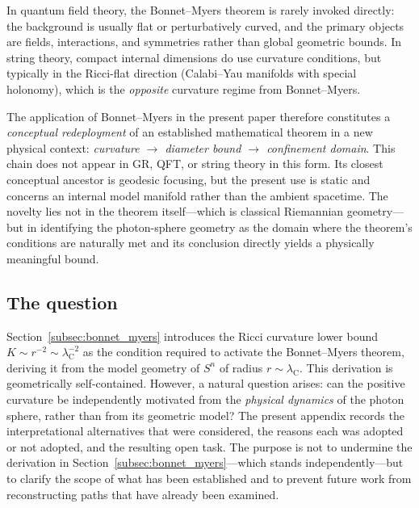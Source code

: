 \documentclass[%
 reprint, amsmath,amssymb, aps, prb, ]{revtex4-2}
\numberwithin{equation}{section}
\newcommand{\lambdaC}{\lambda_{\mathrm{C}}}
\begin{document}
In quantum field theory, the Bonnet--Myers theorem is rarely invoked directly: the background is usually flat or perturbatively curved, and the primary objects are fields, interactions, and symmetries rather than global geometric bounds. In string theory, compact internal dimensions do use curvature conditions, but typically in the Ricci-flat direction (Calabi--Yau manifolds with special holonomy), which is the \emph{opposite} curvature regime from Bonnet--Myers.

The application of Bonnet--Myers in the present paper therefore constitutes a \emph{conceptual redeployment} of an established mathematical theorem in a new physical context: \emph{curvature $\to$ diameter bound $\to$ confinement domain}. This chain does not appear in GR, QFT, or string theory in this form. Its closest conceptual ancestor is geodesic focusing, but the present use is static and concerns an internal model manifold rather than the ambient spacetime. The novelty lies not in the theorem itself---which is classical Riemannian geometry---but in identifying the photon-sphere geometry as the domain where the theorem's conditions are naturally met and its conclusion directly yields a physically meaningful bound.

\subsection{The question}

Section~\ref{subsec:bonnet_myers} introduces the Ricci curvature lower bound $K \sim r^{-2} \sim \lambdaC^{-2}$ as the condition required to activate the Bonnet--Myers theorem, deriving it from the model geometry of $S^n$ of radius $r \sim \lambdaC$. This derivation is geometrically self-contained. However, a natural question arises: can the positive curvature be independently motivated from the \emph{physical dynamics} of the photon sphere, rather than from its geometric model? The present appendix records the interpretational alternatives that were considered, the reasons each was adopted or not adopted, and the resulting open task. The purpose is not to undermine the derivation in Section~\ref{subsec:bonnet_myers}---which stands independently---but to clarify the scope of what has been established and to prevent future work from reconstructing paths that have already been examined.
\end{document}
